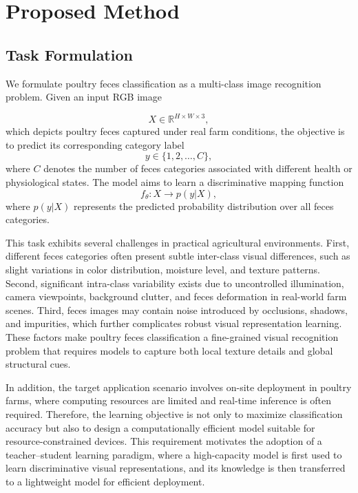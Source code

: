 \documentclass[review]{elsarticle}
\begin{document}
\section{Proposed Method}
\subsection{Task Formulation}
We formulate poultry feces classification as a multi-class image recognition problem. Given an input RGB image 

\begin{equation}
X \in \mathbb{R}^{H \times W \times 3},
\label{eq:input_image}
\end{equation}
which depicts poultry feces captured under real farm conditions, the objective is to predict its corresponding category label
\begin{equation}
y \in \{1, 2, \dots, C\},
\label{eq:label_space}
\end{equation}
where $C$ denotes the number of feces categories associated with different health or physiological states. The model aims to learn a discriminative mapping function
\begin{equation}
f_{\theta} : X \to p(y|X),
\label{eq:model_mapping}
\end{equation}
where $p(y|X)$ represents the predicted probability distribution over all feces categories.

This task exhibits several challenges in practical agricultural environments. First, different feces categories often present subtle inter-class visual differences, such as slight variations in color distribution, moisture level, and texture patterns. Second, significant intra-class variability exists due to uncontrolled illumination, camera viewpoints, background clutter, and feces deformation in real-world farm scenes. Third, feces images may contain noise introduced by occlusions, shadows, and impurities, which further complicates robust visual representation learning. These factors make poultry feces classification a fine-grained visual recognition problem that requires models to capture both local texture details and global structural cues.

In addition, the target application scenario involves on-site deployment in poultry farms, where computing resources are limited and real-time inference is often required. Therefore, the learning objective is not only to maximize classification accuracy but also to design a computationally efficient model suitable for resource-constrained devices. This requirement motivates the adoption of a teacher–student learning paradigm, where a high-capacity model is first used to learn discriminative visual representations, and its knowledge is then transferred to a lightweight model for efficient deployment.
\end{document}
